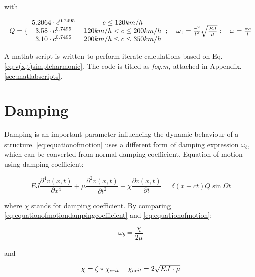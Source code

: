 with 

\begin{dmath}
    \begin{tabular}{c c c}
        $Q = \{$\begin{tabular}{c c c}
            $5.2064\cdot c^{0.7495}$ & $c \leq 120 km/h$ \\
            $3.58\cdot c^{0.7495}$ & $120 km/h < c \leq  200 km/h $\\
            $3.10\cdot c^{0.7495}$ & $200 km/h \leq c \leq 350 km/h$ \\ \end{tabular}; 

        & $\omega_1 = \frac{\pi^2}{l^2}\sqrt{\frac{EJ}{\mu}}$ ;

        & $\omega = \frac{\pi c}{l}$ \\ 
 
    \end{tabular}
\end{dmath}

A matlab script is written to perform iterate calculations based on Eq.\ref{eq:v(x,t)simpleharmonic}. The code is titled as \textit{fog.m}, attached in Appendix.\ref{sec:matlabscripts}. 

\section{Damping}
Damping is an important parameter influencing the dynamic behaviour of a structure. \ref{eq:equationofmotion} uses a different form of damping expression $\omega_b$, which can be converted from normal damping coefficient. Equation of motion using damping coefficient:

\begin{equation}\label{eq:equationofmotiondampingcoefficient}
    EJ\frac{\partial^4 v(x,t)}{\partial x^4} + \mu\frac{\partial^2 v(x,t)}{\partial t^2} +\chi \frac{\partial v(x,t)}{\partial t} = \delta(x-ct)Q\sin\Omega t 
\end{equation}

where $\chi$ stands for damping coefficient. By comparing \ref{eq:equationofmotiondampingcoefficient} and \ref{eq:equationofmotion}:

\begin{equation}
    \omega_b = \frac{\chi}{2\mu}
\end{equation}

and

\begin{dmath}
\begin{tabular}{cc}

    $\chi = \zeta * \chi_{crit}$ 
    & $\chi_{crit} = 2\sqrt{EJ\cdot \mu}$
\end{tabular}
\end{dmath}

